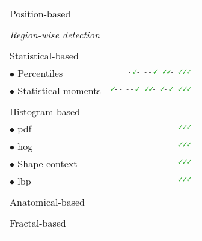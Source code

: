 \begin{table}
\begin{tabular}{l r}
  \quad \quad Position-based & \cite{Chan2003,Litjens2011,Litjens2012,Litjens2014} \\ \\ [-1.5ex]
  \quad \textit{Region-wise detection} &  \\ \\ [-1.5ex]
  \quad \quad Statistical-based & \\
  \quad \quad \quad $\bullet$ Percentiles & $^{\text{- {\cmarksmall}-}}$\cite{Vos2008a}  $^{\text{- - {\cmarksmall}}}$\cite{Antic2013,Peng2013} $^{\text{{\cmarksmall}{\cmarksmall}-}}$\cite{Vos2010} $^{\text{{\cmarksmall}{\cmarksmall}{\cmarksmall}}}$\cite{Litjens2011,Litjens2012,Litjens2014,Niaf2011,Niaf2012,Vos2012,lehaire2014computer} \\
  \quad \quad \quad $\bullet$ Statistical-moments & $^{\text{{\cmarksmall}- -}}$\cite{Ampeliotis2007,Ampeliotis2008,Tiwari2009a,Tiwari2010,Tiwari2013,Viswanath2008,Viswanath2009,Viswanath2012,rampun2016quantitative,rampun2015computer,rampun2016computer} $^{\text{- - {\cmarksmall}}}$\cite{Antic2013} $^{\text{{\cmarksmall}{\cmarksmall}-}}$\cite{Viswanath2011} $^{\text{{\cmarksmall}- {\cmarksmall}}}$\cite{Peng2013,cameron2014multiparametric,cameron2016maps,khalvati2015automated,chung2015prostate} $^{\text{{\cmarksmall}{\cmarksmall}{\cmarksmall}}}$\cite{Litjens2011,Litjens2012,Litjens2014,Niaf2011,Niaf2012,lehaire2014computer} \\ \\ [-1.5ex]
  \quad \quad Histogram-based & \\
  \quad \quad \quad $\bullet$ \acs{pdf} & $^{\text{{\cmarksmall}{\cmarksmall}{\cmarksmall}}}$\cite{Liu2013} \\
  \quad \quad \quad $\bullet$ \acs{hog} & $^{\text{{\cmarksmall}{\cmarksmall}{\cmarksmall}}}$\cite{Liu2013} \\
  \quad \quad \quad $\bullet$ Shape context & $^{\text{{\cmarksmall}{\cmarksmall}{\cmarksmall}}}$\cite{Liu2013} \\
  \quad \quad \quad $\bullet$ \acs{lbp} & $^{\text{{\cmarksmall}{\cmarksmall}{\cmarksmall}}}$\cite{Liu2013,Lemaitre2016thesis} \\ \\ [-1.5ex]
  \quad \quad Anatomical-based & \cite{Litjens2012,Litjens2014,Matulewicz2013,cameron2014multiparametric,cameron2016maps} \\ \\ [-1.5ex]
  \quad \quad Fractal-based & \cite{Lopes2011,Lv2009} \\ \\ [-1.5ex]

\end{tabular}
\end{table}

